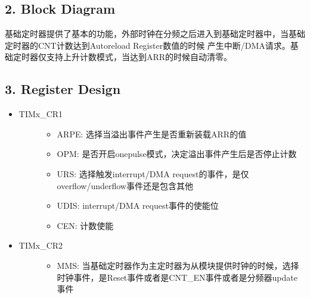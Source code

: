 \documentclass[letterpaper,10pt,english]{sphinxmanual}
\begin{document}
\subsection{2. Block Diagram}
\label{\detokenize{STM32_u5b9a_u65f6_u5668_u8bbe_u8ba1_u4ecb_u7ecd/STM32_u7684_u5b9a_u65f6_u5668_u8bbe_u8ba1_u4ecb_u7ecd:block-diagram}}

基础定时器提供了基本的功能，外部时钟在分频之后进入到基础定时器中，当基础定时器的CNT计数达到Auto\sphinxhyphen{}reload Register数值的时候
产生中断/DMA请求。基础定时器仅支持上升计数模式，当达到ARR的时候自动清零。


\subsection{3. Register Design}
\label{\detokenize{STM32_u5b9a_u65f6_u5668_u8bbe_u8ba1_u4ecb_u7ecd/STM32_u7684_u5b9a_u65f6_u5668_u8bbe_u8ba1_u4ecb_u7ecd:register-design}}\begin{itemize}
\item {} \begin{description}
\item[{TIMx\_CR1}] \leavevmode\begin{itemize}
\item {} 
ARPE: 选择当溢出事件产生是否重新装载ARR的值

\item {} 
OPM:  是否开启one\sphinxhyphen{}pulse模式，决定溢出事件产生后是否停止计数

\item {} 
URS:  选择触发interrupt/DMA request的事件，是仅overflow/underflow事件还是包含其他

\item {} 
UDIS: interrupt/DMA request事件的使能位

\item {} 
CEN:  计数使能

\end{itemize}

\end{description}

\item {} \begin{description}
\item[{TIMx\_CR2}] \leavevmode\begin{itemize}
\item {} 
MMS:  当基础定时器作为主定时器为从模块提供时钟的时候，选择时钟事件，是Reset事件或者是CNT\_EN事件或者是分频器update事件


\end{itemize}
\end{description}
\end{itemize}
\end{document}
